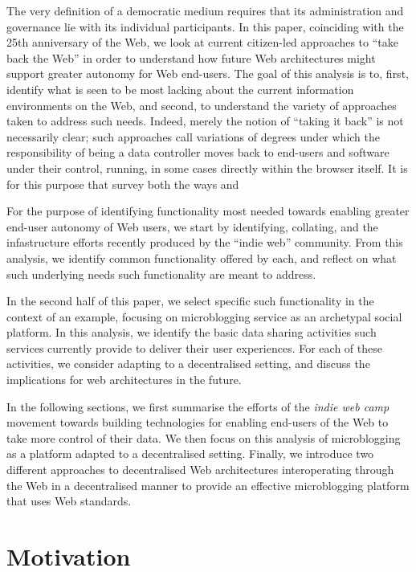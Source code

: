 \documentclass{acm_proc_article-sp}
\begin{document}
{The very definition of a democratic medium requires that its administration and governance lie with its individual participants.  In this paper, coinciding with the 25th anniversary of the Web, we look at current citizen-led approaches to ``take back the Web'' in order to understand how future Web architectures might support greater autonomy for Web end-users.  The goal of this analysis is to, first, identify what is seen to be most lacking about the current information environments on the Web, and second, to understand the variety of approaches taken to address such needs.  Indeed, merely the notion of ``taking it back'' is not necessarily clear; such approaches call variations of degrees under which the responsibility of being a data controller moves back to end-users and software under their control, running, in some cases directly within the browser itself.  It is for this purpose that survey both the ways and 
	
For the purpose of identifying functionality most needed towards enabling greater end-user autonomy of Web users, we start by identifying, collating, and the infastructure efforts recently produced by the ``indie web'' community.  From this analysis, we identify common functionality offered by each, and reflect on what such underlying needs such functionality  are meant to address.

In the second half of this paper, we select specific such functionality in the context of an example, focusing on microblogging service as an archetypal social platform.  In this analysis, we identify the basic data sharing activities such services currently provide to deliver their user experiences. For each of these activities, we consider adapting to a decentralised setting, and discuss the implications for web architectures in the future.

In the following sections, we first summarise the efforts of the \emph{indie web camp} movement towards building technologies for enabling end-users of the Web to take more control of their data. We then focus on this analysis of microblogging as a platform adapted to a decentralised setting.  Finally, we introduce two different approaches to decentralised Web architectures interoperating  through the Web in a decentralised manner to provide an effective microblogging platform that uses Web standards.

\section{Motivation}

}
\end{document}
